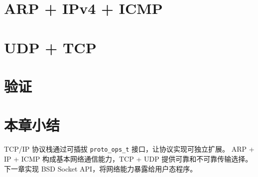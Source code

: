 \section{ARP + IPv4 + ICMP}
\label{sec:tcpip-arp-ip-icmp}


\section{UDP + TCP}
\label{sec:tcpip-tcp}


\section{验证}
\label{sec:tcpip-verify}


\section{本章小结}

TCP/IP 协议栈通过可插拔 \texttt{proto\_ops\_t} 接口，让协议实现可独立扩展。
ARP + IP + ICMP 构成基本网络通信能力，TCP + UDP 提供可靠和不可靠传输选择。
下一章实现 BSD Socket API，将网络能力暴露给用户态程序。

